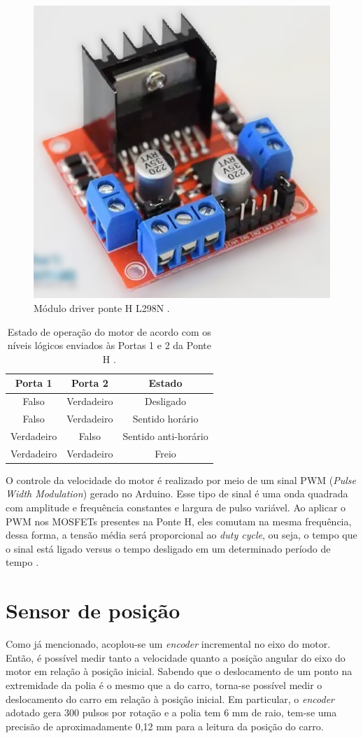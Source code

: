 \begin{figure}[H]
    \centering
    \includegraphics[width=0.3\linewidth]{figuras/L298N.jpg}
    \caption[Módulo driver ponte H L298N]{Módulo driver ponte H L298N \cite{L298N}.}
    \label{fig:ponteH}
\end{figure}

\begin{table}[H]
    \centering
    \caption[Estado de operação do motor de acordo com os níveis lógicos enviados às Portas 1 e 2 da Ponte H]{Estado de operação do motor de acordo com os níveis lógicos enviados às Portas 1 e 2 da Ponte H \cite{L298N}.}
    \begin{tabular}{c|c|c}
    \textbf{Porta} 1 & \textbf{Porta} 2 & \textbf{Estado} \\
    \hline
    Falso & Verdadeiro & Desligado \\
    Falso & Verdadeiro & Sentido horário \\
    Verdadeiro & Falso & Sentido anti-horário \\
    Verdadeiro & Verdadeiro & Freio \\
    \end{tabular}

    \label{tab:pinos_ponte}
\end{table}

O controle da velocidade do motor é realizado  por meio de um sinal PWM (\textit{Pulse Width Modulation}) gerado no Arduino. Esse tipo de sinal é uma onda quadrada com amplitude e frequência constantes e largura de pulso variável. Ao aplicar o PWM nos MOSFETs presentes na Ponte H, eles comutam na mesma frequência, dessa forma, a tensão média será proporcional ao \textit{duty cycle}, ou seja, o tempo que o sinal está ligado versus o tempo desligado em um determinado período de tempo \cite{morais2023implementaccao}. 

\section{Sensor de posição}
 Como já mencionado, acoplou-se um \textit{encoder} incremental no eixo do motor. Então, é possível medir tanto a velocidade quanto a posição angular do eixo do motor em relação à posição inicial. Sabendo que o deslocamento de um ponto na extremidade da polia é o mesmo que a do carro, torna-se possível medir o deslocamento do carro em relação à posição inicial. Em particular, o \textit{encoder} adotado gera 300 pulsos por rotação e a polia tem 6 mm de raio, tem-se uma precisão de aproximadamente 0,12 mm para a leitura da posição do carro.

